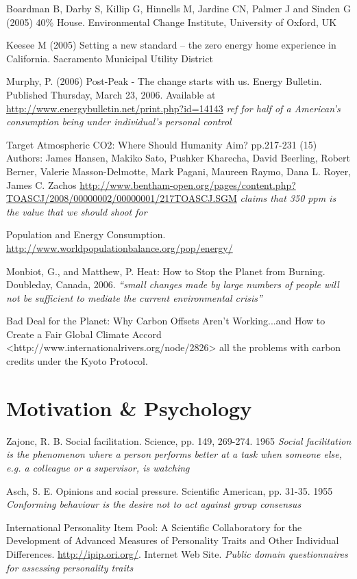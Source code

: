 Boardman B, Darby S, Killip G, Hinnells M, Jardine CN, Palmer J and Sinden G (2005) 40\% House. Environmental Change Institute, University of Oxford, UK

Keesee M (2005) Setting a new standard – the zero energy home experience in California. Sacramento Municipal Utility District

Murphy, P. (2006) Post-Peak - The change starts with us. Energy Bulletin. Published Thursday, March 23, 2006. Available at \url{http://www.energybulletin.net/print.php?id=14143} \emph{ref for half of a American's consumption being under individual's personal control}

Target Atmospheric CO2: Where Should Humanity Aim? pp.217-231 (15) Authors: James Hansen, Makiko Sato, Pushker Kharecha, David Beerling, Robert Berner, Valerie Masson-Delmotte, Mark Pagani, Maureen Raymo, Dana L. Royer, James C. Zachos \url{http://www.bentham-open.org/pages/content.php?TOASCJ/2008/00000002/00000001/217TOASCJ.SGM} \emph{claims that 350 ppm is the \COtwo value that we should shoot for}

Population and Energy Consumption. \url{http://www.worldpopulationbalance.org/pop/energy/}

Monbiot, G., and Matthew, P.  Heat: How to Stop the Planet from Burning.  Doubleday, Canada, 2006. \emph{``small changes made by large numbers of people will not be sufficient to mediate the current environmental crisis''}

Bad Deal for the Planet: Why Carbon Offsets Aren't Working...and How to Create a Fair Global Climate Accord <http://www.internationalrivers.org/node/2826> all the problems with carbon credits under the Kyoto Protocol.




\section{Motivation \& Psychology}
Zajonc, R. B. Social facilitation. Science, pp. 149, 269-274. 1965 \emph{Social facilitation is the phenomenon where a person performs better at a task when someone else, e.g. a colleague or a supervisor, is watching}

Asch, S. E. Opinions and social pressure. Scientiﬁc American, pp. 31-35. 1955 \emph{Conforming behaviour is the desire not to act against group consensus}

International Personality Item Pool: A Scientific Collaboratory for the Development of Advanced Measures of Personality Traits and Other Individual Differences. \url{http://ipip.ori.org/}. Internet Web Site. \emph{Public domain questionnaires for assessing personality traits}

